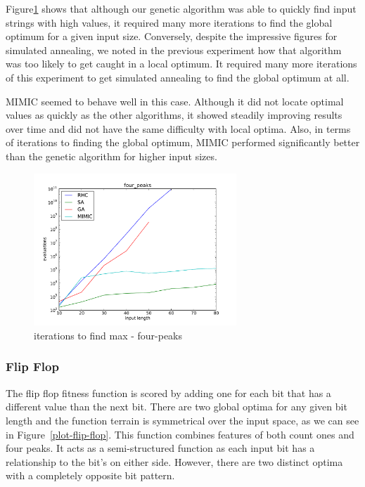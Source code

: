 \documentclass{sig-alternate}
\begin{document}
Figure\ref{max-four-peaks} shows that although our genetic algorithm was able to quickly find input strings with high values, it required many more iterations to find the global optimum for a given input size. Conversely, despite the impressive figures for simulated annealing, we noted in the previous experiment how that algorithm was too likely to get caught in a local optimum. It required many more iterations of this experiment to get simulated annealing to find the global optimum at all.

MIMIC seemed to behave well in this case. Although it did not locate optimal values as quickly as the other algorithms, it showed steadily improving results over time and did not have the same difficulty with local optima. Also, in terms of iterations to finding the global optimum, MIMIC performed significantly better than the genetic algorithm for higher input sizes.

\begin{figure}[!htbp]
    \centering
    \includegraphics[width=3in]{part1.2/four-peaks-max.pdf}
    \caption{iterations to find max - four-peaks\label{max-four-peaks}}
\end{figure} 

\subsubsection{Flip Flop}

The flip flop fitness function is scored by adding one for each bit that has a different value than the next bit. There are two global optima for any given bit length and the function terrain is symmetrical over the input space, as we can see in Figure~\ref{plot-flip-flop}. This function combines features of both count ones and four peaks. It acts as a semi-structured function as each input bit has a relationship to the bit's on either side. However, there are two distinct optima with a completely opposite bit pattern.
\end{document}

